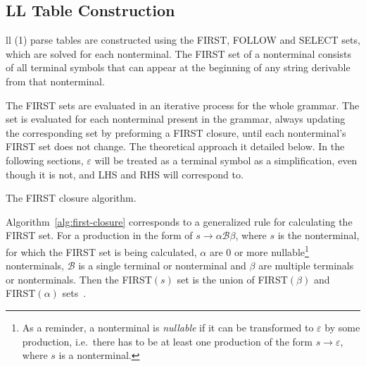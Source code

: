 \subsection{LL Table Construction}
\gls{ll} (1) parse tables are constructed using the FIRST, FOLLOW and SELECT sets, which are solved for each nonterminal. The FIRST set of a nonterminal consists of all terminal symbols that can appear at the beginning of any string derivable from that nonterminal.

The FIRST sets are evaluated in an iterative process for the whole grammar. The set is evaluated for each nonterminal present in the grammar, always updating the corresponding set by preforming a FIRST closure, until each nonterminal's FIRST set does not change. The theoretical approach it detailed below. In the following sections, $\varepsilon$ will be treated as a terminal symbol as a simplification, even though it is not, and LHS and RHS will correspond to. 


\begingroup
\vspace{1.5em}
\begin{algorithm}[H]
  \setlength{\algomargin}{1.5em}


\caption{The FIRST closure algorithm.}
\label{alg:first-closure}
\end{algorithm}
\vspace{1.5em}
\endgroup

Algorithm~\ref{alg:first-closure} corresponds to a generalized rule for calculating the FIRST set. For a production in the form of $s \rightarrow \alpha \mathcal{B} \beta$, where $s$ is the nonterminal, for which the FIRST set is being calculated, $\alpha$ are 0 or more nullable\footnote{As a reminder, a nonterminal is \emph{nullable} if it can be transformed to $\varepsilon$ by some production, i.e.\ there has to be at least one production of the form $s \rightarrow \varepsilon$, where $s$ is a nonterminal.} nonterminals, $\mathcal{B}$ is a single terminal or nonterminal and $\beta$ are multiple terminals or nonterminals. Then the FIRST$(s)$ set is the union of FIRST$(\beta)$ and FIRST$(\alpha)$ sets~\cite[Chapter~4.7.1]{Holub_1990}.


